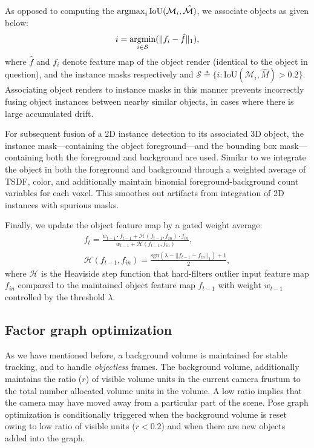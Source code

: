 As opposed to computing the $\operatorname*{\arg\!\max}_{i}{\text{IoU}(\mathcal{M}_i, \hat{\mathcal{M})}}$, we associate objects as given below:
\begin{align}
    i = \operatorname*{\arg\!\min}_{i \in \mathcal{S}} (\| f_i - \hat{f} \|_1),
\end{align}
where $\hat{f}$ and $f_i$ denote feature map of the object render (identical to the object in question), and the instance masks respectively and $\mathcal{S} \triangleq \{i : \text{IoU}(\mathcal{M}_i, \hat{M}) > 0.2\}$.
Associating object renders to instance masks in this manner prevents incorrectly fusing object instances between nearby similar objects, in cases where there is large accumulated drift.


For subsequent fusion of a 2D instance detection to its associated 3D object, the instance mask---containing the object foreground---and the bounding box mask---containing both the foreground and background are used. Similar to \cite{fusionPP} we integrate the object in both the foreground and background through a weighted average of TSDF, color, and additionally maintain binomial foreground-background count variables for each voxel. This smoothes out artifacts from integration of 2D instances with spurious masks.

Finally, we update the object feature map by a gated weight average:
\begin{align}
    f_t = \frac{w_{t-1} \cdot f_{t-1} + \mathcal{H}(f_{t-1}, f_{in}) \cdot f_{in}}{w_{t-1} + \mathcal{H}(f_{t-1}, f_{in})},\\
    \mathcal{H}(f_{t-1}, f_{in}) = \frac{\textrm{sgn}(\lambda - ||f_{t-1} - f_{in}||_1) + 1}{2},
\end{align}
where $\mathcal{H}$ is the Heaviside step function that hard-filters outlier input feature map $f_{in}$ compared to the maintained object feature map $f_{t-1}$ with weight $w_{t-1}$ controlled by the threshold $\lambda$.





\subsection{Factor graph optimization} \label{subsec: optimization}
As we have mentioned before, a background volume is maintained for stable tracking, and to handle \textit{objectless} frames. The background volume, additionally maintains the ratio ($r$) of visible volume units in the current camera frustum to the total number allocated volume units in the volume. A low ratio implies that the camera may have moved away from a particular part of the scene. Pose graph optimization is conditionally triggered when the background volume is reset owing to low ratio of visible units ($r < 0.2$) and when there are new objects added into the graph.

